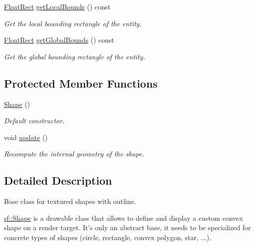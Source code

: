 \begin{DoxyCompactItemize}
\hyperlink{classsf_1_1Rect}{Float\-Rect} \hyperlink{classsf_1_1Shape_a5d26a18ccfe850ff8d327ca97edbc34a}{get\-Local\-Bounds} () const 
\begin{DoxyCompactList}\small\item\em Get the local bounding rectangle of the entity. \end{DoxyCompactList}\item 
\hyperlink{classsf_1_1Rect}{Float\-Rect} \hyperlink{classsf_1_1Shape_a5257341fe832884dbba6b9dc855e33cc}{get\-Global\-Bounds} () const 
\begin{DoxyCompactList}\small\item\em Get the global bounding rectangle of the entity. \end{DoxyCompactList}\end{DoxyCompactItemize}
\subsection*{Protected Member Functions}
\begin{DoxyCompactItemize}
\item 
\hypertarget{classsf_1_1Shape_a413a457f720835b9f5d8e97ca8b80960}{\hyperlink{classsf_1_1Shape_a413a457f720835b9f5d8e97ca8b80960}{Shape} ()}\label{classsf_1_1Shape_a413a457f720835b9f5d8e97ca8b80960}

\begin{DoxyCompactList}\small\item\em Default constructor. \end{DoxyCompactList}\item 
void \hyperlink{classsf_1_1Shape_adfb2bd966c8edbc5d6c92ebc375e4ac1}{update} ()
\begin{DoxyCompactList}\small\item\em Recompute the internal geometry of the shape. \end{DoxyCompactList}\end{DoxyCompactItemize}


\subsection{Detailed Description}
Base class for textured shapes with outline. 

\hyperlink{classsf_1_1Shape}{sf\-::\-Shape} is a drawable class that allows to define and display a custom convex shape on a render target. It's only an abstract base, it needs to be specialized for concrete types of shapes (circle, rectangle, convex polygon, star, ...).

